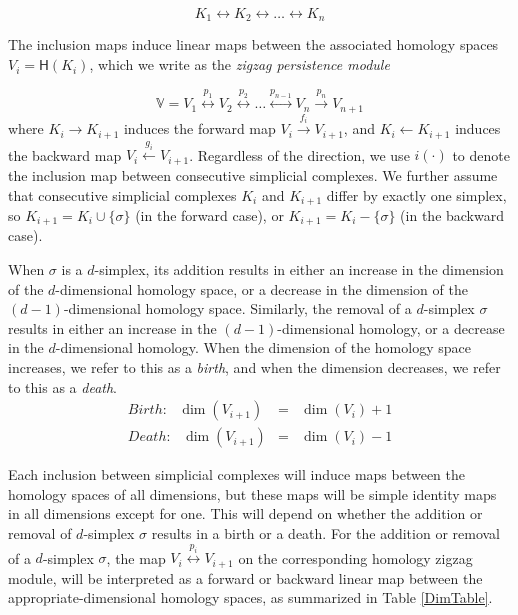 \documentclass[12pt]{article}
\begin{document}
\begin{equation*}\label{zzSequence}
K_1 \longleftrightarrow K_2 \longleftrightarrow \ldots \longleftrightarrow K_n
\end{equation*}

The inclusion maps induce linear maps between the associated homology spaces $V_i = \mathsf{H}(K_i)$, which we write as the \emph{zigzag persistence module}

\begin{equation}\label{zzModule}
\mathbb{V}  = V_1 \overset{p_1}{\longleftrightarrow} V_2 \overset{p_2}{\longleftrightarrow} \ldots \overset{p_{n-1}}{\longleftrightarrow} V_n \overset{p_n}{\longrightarrow} V_{n+1}
\end{equation}
where $K_i \longrightarrow K_{i+1}$ induces the forward map $V_i \overset{f_i}{\longrightarrow} V_{i+1}$, and $K_i \longleftarrow K_{i+1}$ induces the backward map $V_i \overset{g_i}{\longleftarrow} V_{i+1}$. Regardless of the direction, we use $i(\cdot)$ to denote the inclusion map between consecutive simplicial complexes. We further assume that consecutive simplicial complexes $K_i$ and $K_{i+1}$ differ by exactly one simplex, so $K_{i+1} = K_i \cup \{\sigma\}$ (in the forward case), or $K_{i+1} = K_i - \{\sigma\}$ (in the backward case).

When $\sigma$ is a $d$-simplex, its addition results in either an increase in the dimension of the $d$-dimensional homology space, or a decrease in the dimension of the $(d-1)$-dimensional homology space. Similarly, the removal of a $d$-simplex $\sigma$ results in either an increase in the $(d-1)$-dimensional homology, or a decrease in the $d$-dimensional homology. When the dimension of the homology space increases, we refer to this as a \emph{birth}, and when the dimension decreases, we refer to this as a \emph{death}.
\begin{eqnarray}
Birth: \mbox{ } \dim(V_{i+1}) & = & \dim(V_i) + 1  \nonumber \\
Death: \mbox{ } \dim(V_{i+1}) & = & \dim(V_i) - 1 \nonumber
\end{eqnarray}

Each inclusion between simplicial complexes will induce maps between the homology spaces of all dimensions, but these maps will be simple identity maps in all dimensions except for one. This will depend on whether the addition or removal of $d$-simplex $\sigma$ results in a birth or a death. For the addition or removal of a $d$-simplex $\sigma$, the map $V_i \overset{p_i}{\longleftrightarrow} V_{i+1}$ on the corresponding homology zigzag module, will be interpreted as a forward or backward linear map between the appropriate-dimensional homology spaces, as summarized in Table \ref{DimTable}.
\end{document}
